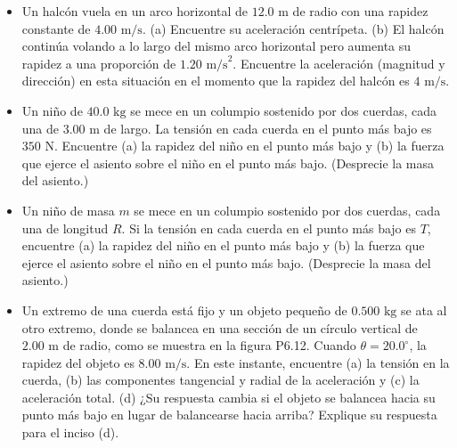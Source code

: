 \documentclass[11pt,a4paper]{article}
\begin{document}
\begin{itemize}
    \item[\textbf{9.}] Un halcón vuela en un arco horizontal de $12.0 \text{ m}$ de radio con una rapidez constante de $4.00 \text{ m/s}$. (a) Encuentre su aceleración centrípeta. (b) El halcón continúa volando a lo largo del mismo arco horizontal pero aumenta su rapidez a una proporción de $1.20 \text{ m/s}^2$. Encuentre la aceleración (magnitud y dirección) en esta situación en el momento que la rapidez del halcón es $4 \text{ m/s}$.
    \vspace*{6cm}

    \item[\textbf{10.}] Un niño de $40.0 \text{ kg}$ se mece en un columpio sostenido por dos cuerdas, cada una de $3.00 \text{ m}$ de largo. La tensión en cada cuerda en el punto más bajo es $350 \text{ N}$. Encuentre (a) la rapidez del niño en el punto más bajo y (b) la fuerza que ejerce el asiento sobre el niño en el punto más bajo. (Desprecie la masa del asiento.)
    \vspace*{6cm}

    \item[\textbf{11.}] Un niño de masa $m$ se mece en un columpio sostenido por dos cuerdas, cada una de longitud $R$. Si la tensión en cada cuerda en el punto más bajo es $T$, encuentre (a) la rapidez del niño en el punto más bajo y (b) la fuerza que ejerce el asiento sobre el niño en el punto más bajo. (Desprecie la masa del asiento.)
    \vspace*{6cm}

    \item[\textbf{12.}] Un extremo de una cuerda está fijo y un objeto pequeño de $0.500 \text{ kg}$ se ata al otro extremo, donde se balancea en una sección de un círculo vertical de $2.00 \text{ m}$ de radio, como se muestra en la figura P6.12. Cuando $\theta = 20.0^\circ$, la rapidez del objeto es $8.00 \text{ m/s}$. En este instante, encuentre (a) la tensión en la cuerda, (b) las componentes tangencial y radial de la aceleración y (c) la aceleración total. (d) ¿Su respuesta cambia si el objeto se balancea hacia su punto más bajo en lugar de balancearse hacia arriba? Explique su respuesta para el inciso (d).
    \vspace*{8cm}
\end{itemize}

\newpage
\end{document}
